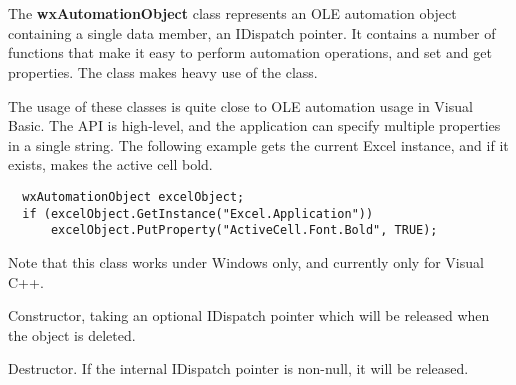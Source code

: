 \section{}\label{wxautomationobject}

The {\bf wxAutomationObject} class represents an OLE automation object containing a single data member,
an IDispatch pointer. It contains a number of functions that make it easy to perform
automation operations, and set and get properties. The class makes heavy use of the  class.

The usage of these classes is quite close to OLE automation usage in Visual Basic. The API is
high-level, and the application can specify multiple properties in a single string. The following example
gets the current Excel instance, and if it exists, makes the active cell bold.

{\small
\begin{verbatim}
  wxAutomationObject excelObject;
  if (excelObject.GetInstance("Excel.Application"))
      excelObject.PutProperty("ActiveCell.Font.Bold", TRUE);
\end{verbatim}
}

Note that this class works under Windows only, and currently only for Visual C++.






\label{wxautomationobjectctor}


Constructor, taking an optional IDispatch pointer which will be released when the
object is deleted.

\label{wxautomationobjectdtor}


Destructor. If the internal IDispatch pointer is non-null, it will be released.

\label{wxautomationobjectcallmethod}


